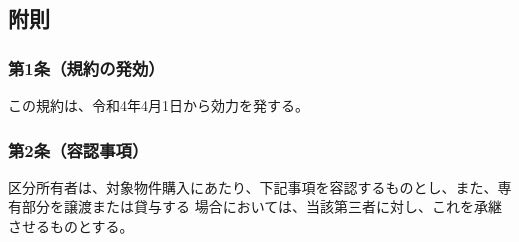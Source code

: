 \documentclass[
  luatex,
  paper=a4paper,
  fontsize=11pt,
  jafontsize=11pt,
  jlreq_notes,
]{jlreq}
\begin{document}
  \begin{center}
    \subsection*{附則}
  \end{center}
  \subsubsection*{第1条（規約の発効）}
  この規約は、令和4年4月1日から効力を発する。
  \subsubsection*{第2条（容認事項）}
  区分所有者は、対象物件購入にあたり、下記事項を容認するものとし、また、専有部分を譲渡または貸与する
  場合においては、当該第三者に対し、これを承継させるものとする。\\
\end{document}
